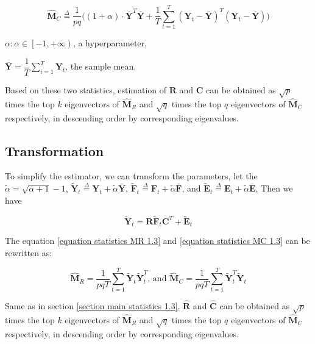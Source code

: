 \documentclass{article}[12pt]
\begin{document}
\begin{equation}
    \mathbf{\widehat{M}}_C  \overset{\Delta}{=} \dfrac{1}{pq}\Bigg((1 + \alpha) \cdot  \mathbf{\overline{Y}}^T\mathbf{\overline{Y}} + \dfrac{1}{T}\sum\limits_{t=1}^T(\mathbf{Y}_t - \mathbf{\overline{Y}})^T(\mathbf{Y}_t - \mathbf{\overline{Y}})\Bigg)
    \label{equation statistics MC 1.3}
\end{equation}


$\alpha: \alpha \in \left[-1, + \infty \right)$, a hyperparameter,

$\mathbf{\overline{Y}} = \dfrac{1}{T} \sum\limits_{i=1}^T\mathbf{Y}_t$, the sample mean.

\noindent Based on these two statistics, estimation of $\mathbf{R}$ and $\mathbf{C}$ can be obtained as $\sqrt{p}$ times the top $k$ eigenvectors of $\widehat{\mathbf{M}}_R$ and $\sqrt{q}$ times the top $q$ eigenvectors of $\widehat{\mathbf{M}}_C$ respectively, in descending order by corresponding eigenvalues.

\subsection{Transformation}\label{section transformation 1.4}
\noindent To simplify the estimator, we can transform the parameters, let the $\tilde{\alpha} = \sqrt{\alpha + 1} - 1$, $\mathbf{\widetilde{Y}}_t \overset{\Delta}{=} \mathbf{Y}_t + \tilde{\alpha}\mathbf{\overline{Y}}$, $\mathbf{\widetilde{F}}_t \overset{\Delta}{=} \mathbf{F}_t + \tilde{\alpha}\mathbf{\overline{F}}$, and $\mathbf{\widetilde{E}}_t \overset{\Delta}{=} \mathbf{E}_t + \tilde{\alpha}\mathbf{\overline{E}}$, Then we have

\begin{equation}
    \mathbf{\widetilde{Y}}_t = \mathbf{R}\mathbf{\widetilde{F}}_t\mathbf{C}^T + \mathbf{\widetilde{E}}_t 
\end{equation}

\noindent The equation \ref{equation statistics MR 1.3} and \ref{equation statistics MC 1.3} can be rewritten as:

\begin{equation}
    \mathbf{\widehat{M}}_R = \frac{1}{pqT}\sum\limits_{t=1}^{T}\mathbf{\widetilde{Y}}_t\mathbf{\widetilde{Y}}_t^T \text{, and } \mathbf{\widehat{M}}_C = \frac{1}{pqT}\sum\limits_{t=1}^{T}\mathbf{\widetilde{Y}}_t^T\mathbf{\widetilde{Y}}_t
\end{equation}

\noindent Same as in section \ref{section main statistics 1.3}, $\mathbf{\widehat{R}}$ and $\mathbf{\widehat{C}}$ can be obtained as $\sqrt{p}$ times the top $k$ eigenvectors of $\widehat{\mathbf{M}}_R$ and $\sqrt{q}$ times the top $q$ eigenvectors of $\widehat{\mathbf{M}}_C$ respectively, in descending order by corresponding eigenvalues.
\end{document}
